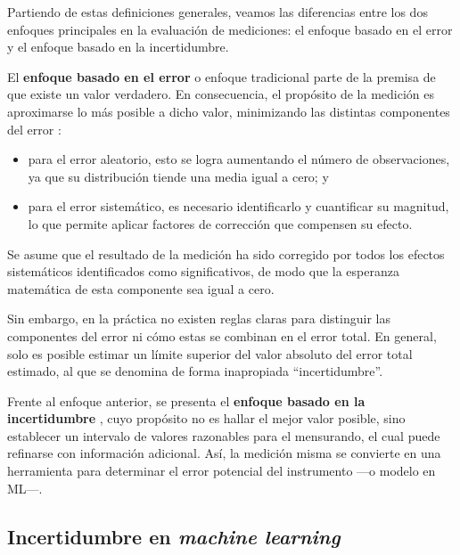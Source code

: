 Partiendo de estas definiciones generales, veamos las diferencias entre los dos enfoques principales en la 
evaluación de mediciones: el enfoque basado en el error y el enfoque basado en la incertidumbre.

El \textbf{enfoque basado en el error} o enfoque tradicional parte de la premisa de que existe un valor 
verdadero. En consecuencia, el propósito de la medición es aproximarse lo más posible a dicho valor, 
minimizando las distintas componentes del error \cite{jcgm100:2008}:

\begin{itemize}

    \item para el error aleatorio, esto se logra aumentando el número de observaciones, ya que su distribución 
    tiende una media igual a cero; y

    \item para el error sistemático, es necesario identificarlo y cuantificar su magnitud, lo que permite 
    aplicar factores de corrección que compensen su efecto.

\end{itemize}

Se asume que el resultado de la medición ha sido corregido por todos los efectos sistemáticos identificados
como significativos, de modo que la esperanza matemática de esta componente sea igual a cero.

Sin embargo, en la práctica no existen reglas claras para distinguir las componentes del error ni cómo estas 
se combinan en el error total. En general, solo es posible estimar un límite superior del valor 
absoluto del error total estimado, al que se denomina de forma inapropiada ``incertidumbre''. 

Frente al enfoque anterior, se presenta el \textbf{enfoque basado en la incertidumbre} \cite{jcgm100:2008}, 
cuyo propósito no es hallar el mejor valor posible, sino establecer un intervalo de valores razonables para el 
mensurando, el cual puede refinarse con información adicional. Así, la medición misma se convierte en una 
herramienta para determinar el error potencial del instrumento ---o modelo en ML---. 


\subsection{Incertidumbre en \textit{machine learning}}

